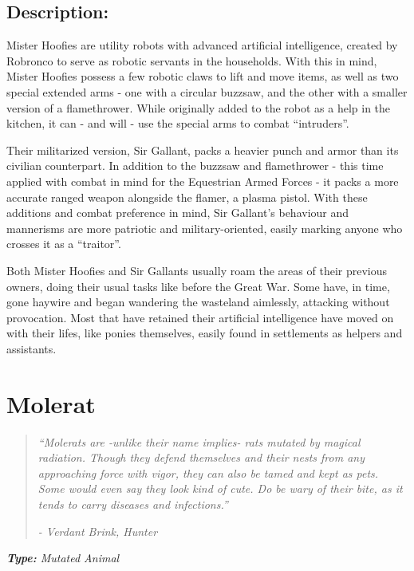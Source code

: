 \documentclass[11pt,a4paper,twocolumn]{book}
\begin{document}
	\subsection*{Description:}
	Mister Hoofies are utility robots with advanced artificial intelligence, created by Robronco to serve as robotic servants in the households. With this in mind, Mister Hoofies possess a few robotic claws to lift and move items, as well as two special extended arms - one with a circular buzzsaw, and the other with a smaller version of a flamethrower. While originally added to the robot as a help in the kitchen, it can - and will - use the special arms to combat ``intruders''.
	
	Their militarized version, Sir Gallant, packs a heavier punch and armor than its civilian counterpart. In addition to the buzzsaw and flamethrower - this time applied with combat in mind for the Equestrian Armed Forces - it packs a more accurate ranged weapon alongside the flamer, a plasma pistol. With these additions and combat preference in mind, Sir Gallant's behaviour and mannerisms are more patriotic and military-oriented, easily marking anyone who crosses it as a ``traitor''. 
	
	\bigskip
	Both Mister Hoofies and Sir Gallants usually roam the areas of their previous owners, doing their usual tasks like before the Great War. Some have, in time, gone haywire and began wandering the wasteland aimlessly, attacking without provocation. Most that have retained their artificial intelligence have moved on with their lifes, like ponies themselves, easily found in settlements as helpers and assistants.
	
	
	\clearpage
	
	\section*{Molerat}
	\begin{quote}
		\emph{``Molerats are -unlike their name implies- rats mutated by magical radiation. Though they defend themselves and their nests from any approaching force with vigor, they can also be tamed and kept as pets. Some would even say they look kind of cute. Do be wary of their bite, as it tends to carry diseases and infections.''}
		
		\emph{-	Verdant Brink, Hunter}
	\end{quote}
	
	\emph{\textbf{Type:} Mutated Animal}
	
\end{document}
